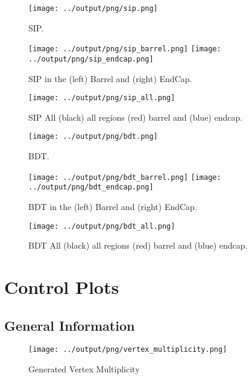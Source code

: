 \documentclass[11pt]{book}
\begin{document}
\begin{figure}[ht]
\centering
\texttt{[image: ../output/png/sip.png]}
\caption{SIP.}
\label{fig:sip}
\end{figure}
\clearpage

\begin{figure}[ht]
\centering
\texttt{[image: ../output/png/sip\_barrel.png]}
\texttt{[image: ../output/png/sip\_endcap.png]}
\caption{SIP in the (left) Barrel and (right) EndCap.}
\label{fig:sip_regions}
\end{figure}

\begin{figure}[htb]
\centering
\texttt{[image: ../output/png/sip\_all.png]}
\caption{SIP All (black) all regions (red) barrel and (blue) endcap.}
\label{fig:sip_all}
\end{figure}

\begin{figure}[htb]
\centering
\texttt{[image: ../output/png/bdt.png]}
\caption{BDT.}
\label{fig:bdt}
\end{figure}
\clearpage

\begin{figure}[htb]
\centering
\texttt{[image: ../output/png/bdt\_barrel.png]}
\texttt{[image: ../output/png/bdt\_endcap.png]}
\caption{BDT in the (left) Barrel and (right) EndCap.}
\label{fig:bdt_regions}
\end{figure}

\begin{figure}[htb]
\centering
\texttt{[image: ../output/png/bdt\_all.png]}
\caption{BDT All (black) all regions (red) barrel and (blue) endcap.}
\label{fig:bdt_all}
\end{figure}

\clearpage

\chapter{Control Plots}
\section{General Information}
\begin{figure}[htb]
\centering
\texttt{[image: ../output/png/vertex\_multiplicity.png]}
\caption{Generated Vertex Multiplicity}
\label{fig:vertex_multiplicity}
\end{figure}
\clearpage
\clearpage
\end{document}
